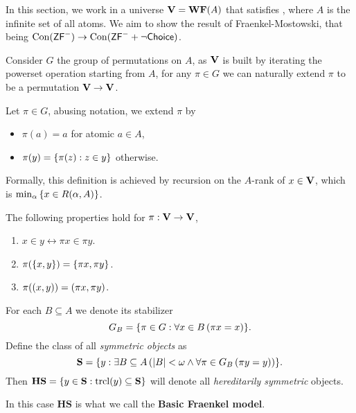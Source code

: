 \newcommand{\Con}{\operatorname{Con}}
In this section, we work in a universe \(\mathbf{V} = \mathbf{WF}(A)\) that satisfies \ZFminus, where \(A\) is the infinite set of all atoms.
We aim to show the result of Fraenkel-Mostowski, that being
\(\Con(\ZFminus) \to \Con(\ZFminus + \lnot\textsf{Choice})\).

Consider \(G\) the group of permutations on \(A\),
as \(\mathbf{V}\) is built by iterating the powerset operation starting from \(A\),
for any \(\pi\in G\) we can naturally extend \(\pi\) to be a permutation \(\mathbf{V}\to\mathbf{V}\).
\begin{definition}
    Let \(\pi \in G\), abusing notation, we extend \(\pi\) by
    \begin{itemize}
        \item \(\pi(a) = a\) for atomic \(a\in A\),
        \item \(\pi(y) = {\left\{ \pi(z): z\in y \right\}}\) otherwise.
    \end{itemize}
\end{definition}
\begin{remark}
    Formally, this definition is achieved by recursion on the \(A\)-rank of \(x\in\mathbf{V}\), which is \(\min_{\alpha} {\left\{ x\in R(\alpha,A) \right\}}\).
\end{remark}
\begin{observation}
    The following properties hold for \(\pi:\mathbf{V}\to\mathbf{V}\),
    \begin{enumerate}
        \item \(x\in y\leftrightarrow \pi x \in \pi y\).
        \item \(\pi({\left\{ x,y \right\}}) = {\left\{ \pi x, \pi y \right\}}\).
        \item \(\pi(\left(x,y\right)) = \left(\pi x, \pi y\right)\).
    \end{enumerate}
\end{observation}

\begin{definition}
    For each \(B\subseteq A\) we denote its stabilizer
    \[ G_B = {\left\{ \pi\in G: \forall x\in B\left(\pi x = x\right) \right\}}.\]
    Define the class of all \emph{symmetric objects} as
    \[ \mathbf{S} = {\left\{ y:\exists B\subseteq A\left(\left\lvert B \right\rvert<\omega \land \forall \pi\in G_B\left(\pi y = y\right)\right) \right\}}. \]
    Then \(\mathbf{HS} = {\left\{ y\in \mathbf{S}:\operatorname{trcl}(y)\subseteq \mathbf{S} \right\}}\) will denote all \emph{hereditarily symmetric} objects.
\end{definition}
\begin{remark}
    In this case \(\mathbf{HS}\) is what we call the \textbf{Basic Fraenkel model}.
\end{remark}

